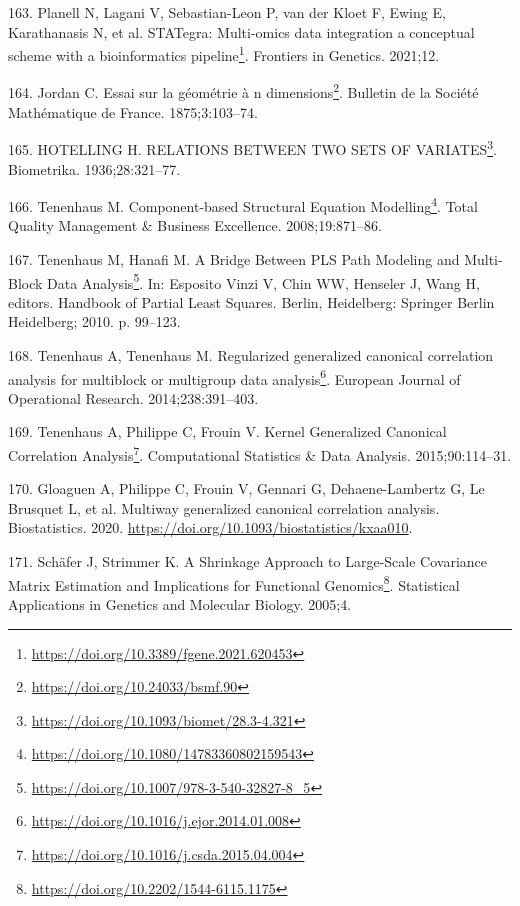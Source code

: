 \documentclass[
  a4paper,
]{book}
\DeclareRobustCommand{\href}[2]{#2\footnote{\url{#1}}}
\newlength{\cslhangindent}
\newlength{\cslentryspacingunit} %
\newenvironment{CSLReferences}[2] %
 {%
  \setlength{\parindent}{0pt}
  \ifodd #1
  \let\oldpar\par
  \def\par{\hangindent=\cslhangindent\oldpar}
  \fi
  \setlength{\parskip}{#2\cslentryspacingunit}
 }%
 {}
\begin{document}
\begin{CSLReferences}{0}{0}
\leavevmode{}%
163. Planell N, Lagani V, Sebastian-Leon P, van der Kloet F, Ewing E, Karathanasis N, et al. \href{https://doi.org/10.3389/fgene.2021.620453}{STATegra: Multi-omics data integration {\textendash} a conceptual scheme with a bioinformatics pipeline}. Frontiers in Genetics. 2021;12.

\leavevmode{}%
164. Jordan C. \href{https://doi.org/10.24033/bsmf.90}{Essai sur la géométrie à n dimensions}. Bulletin de la Société Mathématique de France. 1875;3:103--74.

\leavevmode{}%
165. HOTELLING H. \href{https://doi.org/10.1093/biomet/28.3-4.321}{RELATIONS BETWEEN TWO SETS OF VARIATES}. Biometrika. 1936;28:321--77.

\leavevmode{}%
166. Tenenhaus M. \href{https://doi.org/10.1080/14783360802159543}{Component-based {Structural Equation Modelling}}. Total Quality Management \& Business Excellence. 2008;19:871--86.

\leavevmode{}%
167. Tenenhaus M, Hanafi M. \href{https://doi.org/10.1007/978-3-540-32827-8_5}{A {Bridge Between PLS Path Modeling} and {Multi}-{Block Data Analysis}}. In: Esposito Vinzi V, Chin WW, Henseler J, Wang H, editors. Handbook of {Partial Least Squares}. Berlin, Heidelberg: {Springer Berlin Heidelberg}; 2010. p. 99--123.

\leavevmode{}%
168. Tenenhaus A, Tenenhaus M. \href{https://doi.org/10.1016/j.ejor.2014.01.008}{Regularized generalized canonical correlation analysis for multiblock or multigroup data analysis}. European Journal of Operational Research. 2014;238:391--403.

\leavevmode{}%
169. Tenenhaus A, Philippe C, Frouin V. \href{https://doi.org/10.1016/j.csda.2015.04.004}{Kernel {Generalized Canonical Correlation Analysis}}. Computational Statistics \& Data Analysis. 2015;90:114--31.

\leavevmode{}%
170. Gloaguen A, Philippe C, Frouin V, Gennari G, Dehaene-Lambertz G, Le Brusquet L, et al. Multiway generalized canonical correlation analysis. Biostatistics. 2020. \url{https://doi.org/10.1093/biostatistics/kxaa010}.

\leavevmode{}%
171. Schäfer J, Strimmer K. \href{https://doi.org/10.2202/1544-6115.1175}{A Shrinkage Approach to Large-Scale Covariance Matrix Estimation and Implications for Functional Genomics}. Statistical Applications in Genetics and Molecular Biology. 2005;4.


\end{CSLReferences}
\end{document}
